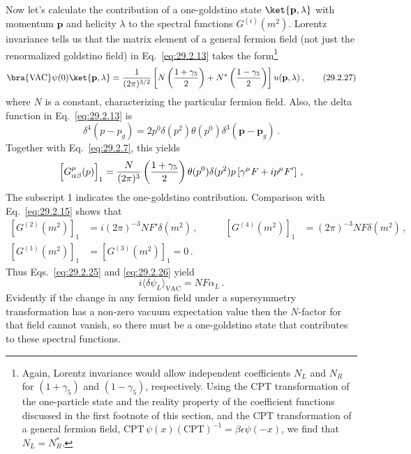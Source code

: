 Now let's calculate the contribution of a one-goldstino state
\(\ket{\mathbf p,\lambda}\) with momentum \(\mathbf p\) and
helicity \(\lambda\) to the spectral functions \(G^{(i)}(m^2)\). Lorentz
invariance tells us that the matrix element of a general fermion field
(not just the renormalized goldstino field) in Eq.~\eqref{eq:29.2.13}
takes the form\footnote{Again, Lorentz invariance would allow independent
coefficients \(N_L\) and \(N_R\) for \((1+\gamma_5)\) and
\((1-\gamma_5)\), respectively. Using the CPT transformation of the
one-particle state and the reality property of the coefficient functions
discussed in the first footnote of this section, and the CPT
transformation of a general fermion field,
\(\mathrm{CPT}\,\psi(x)(\mathrm{CPT})^{-1}
=\beta\epsilon\psi(-x)\), we find that \(N_L=N_R^*\).}
\begin{equation}
  \bra{\mathrm{VAC}}\psi(0)\ket{\mathbf p,\lambda}
  =
  \frac1{(2\pi)^{3/2}}
  \left[
    N\left(\frac{1+\gamma_5}{2}\right)
    +N^*\left(\frac{1-\gamma_5}{2}\right)
  \right]u(\mathbf p,\lambda)\,,
  \tag{29.2.27}\label{eq:29.2.27}
\end{equation}
where \(N\) is a constant, characterizing the particular fermion field.
Also, the delta function in Eq.~\eqref{eq:29.2.13} is
\[
  \delta^4(p-p_g)
  =2p^0\delta(p^2)\theta(p^0)
    \delta^3(\mathbf p-\mathbf p_g)\,.
\]
Together with Eq.~\eqref{eq:29.2.7}, this yields
\[
  \left[G^\mu_{\alpha\beta}(p)\right]_1
  =
  \frac{N}{(2\pi)^3}
  \left(\frac{1+\gamma_5}{2}\right)
  \theta(p^0)\delta(p^2)\sl{p}
  \left[\gamma^\mu F+ip^\mu F'\right]\,,
\]
The subscript 1 indicates the one-goldstino contribution. Comparison with
Eq.~\eqref{eq:29.2.15} shows that
\begin{equation}
  \begin{aligned}
  \left[G^{(2)}(m^2)\right]_1
  &=i(2\pi)^{-3}NF'\delta(m^2)\,,
  &\qquad
  \left[G^{(4)}(m^2)\right]_1
  &=(2\pi)^{-3}NF\delta(m^2)\,,
  \\
  \left[G^{(1)}(m^2)\right]_1
  &=\left[G^{(3)}(m^2)\right]_1=0\,.
  \end{aligned}
  \tag{29.2.28}\label{eq:29.2.28}
\end{equation}
Thus Eqs.~\eqref{eq:29.2.25} and \eqref{eq:29.2.26} yield
\begin{equation}
  i\langle\delta\psi_L\rangle_{\mathrm{VAC}}
  =NF\alpha_L\,.
  \tag{29.2.29}\label{eq:29.2.29}
\end{equation}
Evidently if the change in any fermion field under a supersymmetry
transformation has a non-zero vacuum expectation value then the
\(N\)-factor for that field cannot vanish, so there must be a
one-goldstino state that contributes to these spectral functions.

